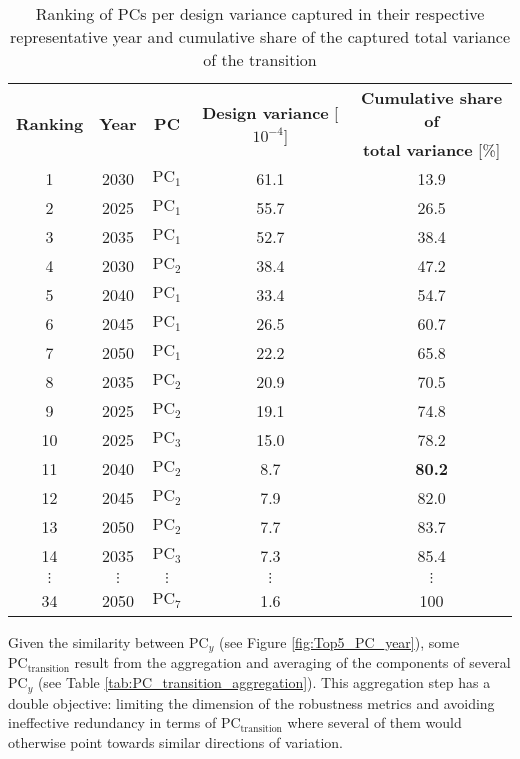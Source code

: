 \begin{table}[htbp!]
\caption{Ranking of \gls{PCs} per design variance captured in their respective representative year and cumulative share of the captured total variance of the transition}
\label{tab:ranking_PCs}
\centering
\begin{tabular}{c c c c c}
\toprule
\multirow{2}{*}{\textbf{Ranking}} & \multirow{2}{*}{\textbf{Year}}  & \multirow{2}{*}{\textbf{PC}} & \multirow{2}{*}{\textbf{Design variance} [$10^{-4}$]} & \textbf{Cumulative share of} \\	
 &   &  &  & \textbf{total variance} [\%] \\	
 \midrule	
1 & 2030 & $\text{PC}_1$ & 61.1 & 13.9 \\
2 & 2025 & $\text{PC}_1$ & 55.7 & 26.5 \\
3 & 2035 & $\text{PC}_1$ & 52.7 & 38.4 \\
4 & 2030 & $\text{PC}_2$ & 38.4 & 47.2 \\
5 & 2040 & $\text{PC}_1$ & 33.4 & 54.7 \\
6 & 2045 & $\text{PC}_1$ & 26.5 & 60.7 \\
7 & 2050 & $\text{PC}_1$ & 22.2 & 65.8 \\
8 & 2035 & $\text{PC}_2$ & 20.9 & 70.5 \\
9 & 2025 & $\text{PC}_2$ & 19.1 & 74.8 \\
10 & 2025 & $\text{PC}_3$ & 15.0 & 78.2 \\
11 & 2040 & $\text{PC}_2$ & 8.7 & \textbf{80.2} \\
12 & 2045 & $\text{PC}_2$ & 7.9 & 82.0 \\
13 & 2050 & $\text{PC}_2$ & 7.7 & 83.7 \\
14 & 2035 & $\text{PC}_3$ & 7.3 & 85.4 \\
$\vdots$ & $\vdots$ & $\vdots$ & $\vdots$ & $\vdots$\\
34 & 2050 & $\text{PC}_7$ & 1.6 & 100 \\
\bottomrule							

\end{tabular}
\end{table}

Given the similarity between $\text{PC}_y$ (see Figure \ref{fig:Top5_PC_year}), some $\text{PC}_{\text{transition}}$ result from the aggregation and averaging of the components of several $\text{PC}_y$ (see Table \ref{tab:PC_transition_aggregation}). This aggregation step has a double objective: limiting the dimension of the robustness metrics and avoiding ineffective redundancy in terms of $\text{PC}_{\text{transition}}$ where several of them would otherwise point towards similar directions of variation.

